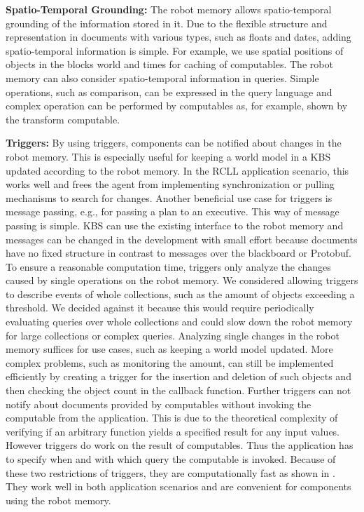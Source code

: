 \textbf{Spatio-Temporal Grounding:}
The robot memory allows spatio-temporal grounding of the information
stored in it. Due to the flexible structure and representation in documents
with various types, such as floats and dates, adding spatio-temporal
information is simple. For example, we use spatial positions
of objects in the blocks world and times for caching of computables.
The robot memory can also consider spatio-temporal information in
queries. Simple operations, such as comparison, can be expressed in
the query language and complex operation can be performed by
computables as, for example, shown by the transform computable.

\textbf{Triggers:}
By using triggers, components can be notified about changes
in the robot memory. This is especially useful for keeping a world
model in a KBS updated according to the robot memory. In the RCLL
application scenario, this works well and frees the agent from
implementing synchronization or pulling mechanisms to search for
changes. Another beneficial use case for triggers is message passing,
e.g., for passing a plan to an executive. This way of message passing
is simple. KBS can use the existing interface to the robot
memory and messages can be changed in the development with small
effort because documents have no fixed structure in contrast to
messages over the blackboard or Protobuf. To ensure a reasonable
computation time, triggers only analyze the changes caused by single
operations on the robot memory. We considered allowing triggers to
describe events of whole collections, such as the amount of objects
exceeding a threshold. We decided against it because this would
require periodically evaluating queries over whole collections and
could slow down the robot memory for large collections or complex
queries. Analyzing single changes in the robot memory suffices for
use cases, such as keeping a world model updated. 
More complex problems, such as monitoring the amount, can still be
implemented efficiently by creating a trigger for the insertion and
deletion of such objects and then checking the object count in the
callback function. Further triggers can not notify about documents
provided by computables without invoking the computable from the
application. This is due to the theoretical complexity of verifying if
an arbitrary function yields a specified result for any input
values. However triggers do work on the result of computables. Thus
the application has to specify when and with which query the computable
is invoked. Because of these two restrictions of triggers, they are
computationally fast as shown in . They
work well in both application scenarios and are convenient for
components using the robot memory.


